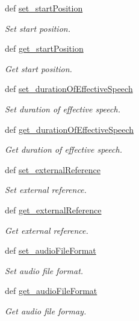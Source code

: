 \begin{DoxyCompactItemize}
def \hyperlink{classlmf_1_1src_1_1resources_1_1audio_1_1_audio_a5cb9580cc6a42f754489706ee7c1820f}{set\+\_\+start\+Position}
\begin{DoxyCompactList}\small\item\em Set start position. \end{DoxyCompactList}\item 
def \hyperlink{classlmf_1_1src_1_1resources_1_1audio_1_1_audio_ad0eb7466e98b326f952a2f451ba6c90d}{get\+\_\+start\+Position}
\begin{DoxyCompactList}\small\item\em Get start position. \end{DoxyCompactList}\item 
def \hyperlink{classlmf_1_1src_1_1resources_1_1audio_1_1_audio_a96749f8400be839b7dd6e9fb96d4a706}{set\+\_\+duration\+Of\+Effective\+Speech}
\begin{DoxyCompactList}\small\item\em Set duration of effective speech. \end{DoxyCompactList}\item 
def \hyperlink{classlmf_1_1src_1_1resources_1_1audio_1_1_audio_a950aecd44c36ce16b7132e9cc86816d8}{get\+\_\+duration\+Of\+Effective\+Speech}
\begin{DoxyCompactList}\small\item\em Get duration of effective speech. \end{DoxyCompactList}\item 
def \hyperlink{classlmf_1_1src_1_1resources_1_1audio_1_1_audio_a2473661ea1705222c0f4f789d0030f50}{set\+\_\+external\+Reference}
\begin{DoxyCompactList}\small\item\em Set external reference. \end{DoxyCompactList}\item 
def \hyperlink{classlmf_1_1src_1_1resources_1_1audio_1_1_audio_a88d3d9df41ca68f9900bf5247c621be5}{get\+\_\+external\+Reference}
\begin{DoxyCompactList}\small\item\em Get external reference. \end{DoxyCompactList}\item 
def \hyperlink{classlmf_1_1src_1_1resources_1_1audio_1_1_audio_ab22801bf39ae13a91fba9f7d6edf0a33}{set\+\_\+audio\+File\+Format}
\begin{DoxyCompactList}\small\item\em Set audio file format. \end{DoxyCompactList}\item 
def \hyperlink{classlmf_1_1src_1_1resources_1_1audio_1_1_audio_a73f30838dc594c852a99427bb1b3cd9e}{get\+\_\+audio\+File\+Format}
\begin{DoxyCompactList}\small\item\em Get audio file formay. \end{DoxyCompactList}\end{DoxyCompactItemize}
